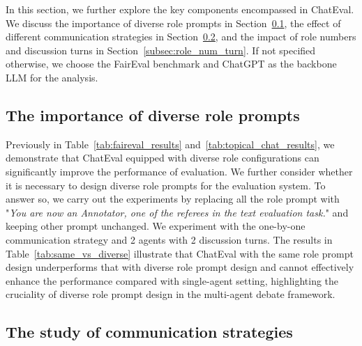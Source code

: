 
In this section, we further explore the key components encompassed in ChatEval. We discuss the importance of diverse role prompts in Section~\ref{subsec:diverse_role}, the effect of different communication strategies in Section~\ref{subsec:communication}, and the impact of role numbers and discussion turns in Section~\ref{subsec:role_num_turn}. If not specified otherwise, we choose the FairEval benchmark and ChatGPT as the backbone LLM for the analysis.



\subsection{The importance of diverse role prompts}\label{subsec:diverse_role}

Previously in Table~\ref{tab:faireval_results} and~\ref{tab:topical_chat_results}, we demonstrate that ChatEval equipped with diverse role configurations can significantly improve the performance of evaluation. We further consider whether it is necessary to design diverse role prompts for the evaluation system. To answer so, we carry out the experiments by replacing all the role prompt with "\textit{You are now an Annotator, one of the referees in the text evaluation task.}" and keeping other prompt unchanged. We experiment with the one-by-one communication strategy and 2 agents with 2 discussion turns. The results in Table~\ref{tab:same_vs_diverse} illustrate that ChatEval with the same role prompt design underperforms that with diverse role prompt design and cannot effectively enhance the performance compared with single-agent setting, highlighting the cruciality of diverse role prompt design in the multi-agent debate framework.


\subsection{The study of communication strategies}\label{subsec:communication}


